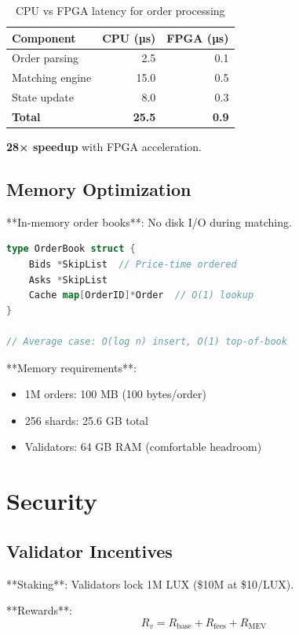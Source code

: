\documentclass[11pt,letterpaper]{article}
\begin{document}
\begin{table}[h]
\centering
\begin{tabular}{lrr}
\toprule
\textbf{Component} & \textbf{CPU (µs)} & \textbf{FPGA (µs)} \\
\midrule
Order parsing & 2.5 & 0.1 \\
Matching engine & 15.0 & 0.5 \\
State update & 8.0 & 0.3 \\
\textbf{Total} & \textbf{25.5} & \textbf{0.9} \\
\bottomrule
\end{tabular}
\caption{CPU vs FPGA latency for order processing}
\end{table}

\textbf{28× speedup} with FPGA acceleration.

\subsection{Memory Optimization}

**In-memory order books**: No disk I/O during matching.

\begin{lstlisting}[language=Go]
type OrderBook struct {
    Bids *SkipList  // Price-time ordered
    Asks *SkipList
    Cache map[OrderID]*Order  // O(1) lookup
}

// Average case: O(log n) insert, O(1) top-of-book
\end{lstlisting}

**Memory requirements**:
\begin{itemize}
    \item 1M orders: 100 MB (100 bytes/order)
    \item 256 shards: 25.6 GB total
    \item Validators: 64 GB RAM (comfortable headroom)
\end{itemize}

\section{Security}

\subsection{Validator Incentives}

**Staking**: Validators lock 1M LUX (\$10M at \$10/LUX).

**Rewards**:
\begin{equation}
R_v = R_{\text{base}} + R_{\text{fees}} + R_{\text{MEV}}
\end{equation}
\end{document}
